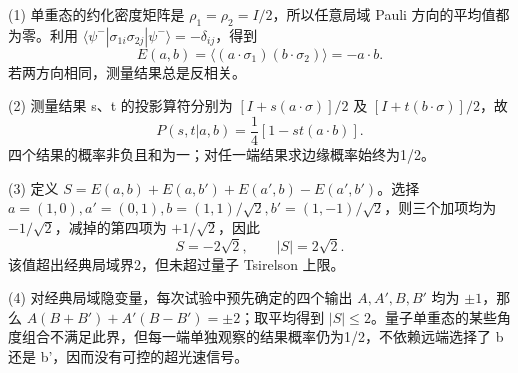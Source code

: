 (1) 单重态的约化密度矩阵是 \(\rho_1=\rho_2=I/2\)，所以任意局域 Pauli 方向的平均值都为零。利用 \(\langle\psi^-|\sigma_{1i}\sigma_{2j}|\psi^-\rangle=-\delta_{ij}\)，得到
\[
E(a,b)=\langle(a\cdot\sigma_1)(b\cdot\sigma_2)\rangle=-a\cdot b.
\]
若两方向相同，测量结果总是反相关。

(2) 测量结果 s、t 的投影算符分别为 \([I+s(a\cdot\sigma)]/2\) 及 \([I+t(b\cdot\sigma)]/2\)，故
\[
P(s,t|a,b)=\frac14[1-st(a\cdot b)].
\]
四个结果的概率非负且和为一；对任一端结果求边缘概率始终为1/2。

(3) 定义 \(S=E(a,b)+E(a,b')+E(a',b)-E(a',b')\)。选择
\(a=(1,0),a'=(0,1),b=(1,1)/\sqrt2,b'=(1,-1)/\sqrt2\)，则三个加项均为 \(-1/\sqrt2\)，减掉的第四项为 \(+1/\sqrt2\)，因此
\[
S=-2\sqrt2,\qquad |S|=2\sqrt2.
\]
该值超出经典局域界2，但未超过量子 Tsirelson 上限。

(4) 对经典局域隐变量，每次试验中预先确定的四个输出 \(A,A',B,B'\) 均为 \(\pm 1\)，那么 \(A(B+B')+A'(B-B')=\pm2\)；取平均得到 \(|S|\le 2\)。量子单重态的某些角度组合不满足此界，但每一端单独观察的结果概率仍为1/2，不依赖远端选择了 b 还是 b'，因而没有可控的超光速信号。
